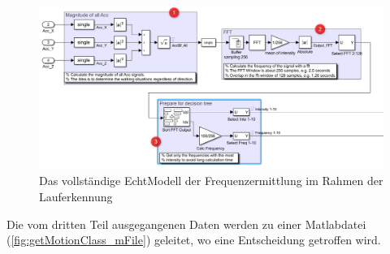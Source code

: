 \begin{figure}
	\centering
	\includegraphics[width=\linewidth]{Bilder/Lauferkennung_Modell_1_1.png}
	\caption{Das vollständige EchtModell der Frequenzermittlung im Rahmen der Lauferkennung}
	\label{fig:Lauferkennung_Freqbasiert_FFT_Echtmodell}
\end{figure}

Die vom dritten Teil ausgegangenen Daten werden zu einer Matlabdatei (\autoref{fig:getMotionClass_mFile}) geleitet, wo eine Entscheidung getroffen wird.
%
%
%

